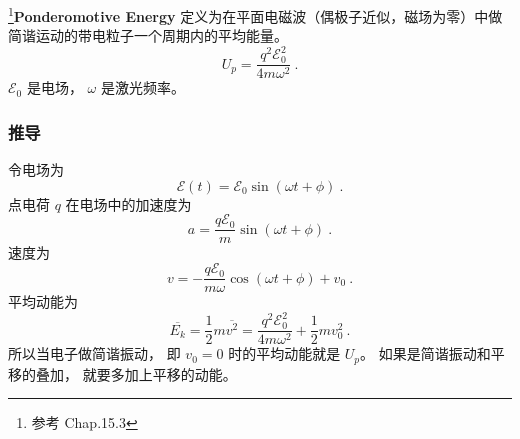 

\footnote{参考 \cite{Bransden} Chap.15.3}\textbf{Ponderomotive Energy} 定义为在平面电磁波（偶极子近似，磁场为零）中做简谐运动的带电粒子一个周期内的平均能量。
\begin{equation}\label{eq_Ponder_1}
U_p = \frac{q^2 \mathcal E_0^2}{4m\omega^2}~.
\end{equation}
$\mathcal E_0$ 是电场， $\omega$ 是激光频率。

\subsubsection{推导}
令电场为
\begin{equation}
\mathcal E(t) = \mathcal E_0 \sin(\omega t + \phi)~.
\end{equation}
点电荷 $q$ 在电场中的加速度为
\begin{equation}
a = \frac{q\mathcal E_0}{m} \sin(\omega t + \phi)~.
\end{equation}
速度为
\begin{equation}
v = -\frac{q\mathcal E_0}{m\omega} \cos(\omega t + \phi) + v_0~.
\end{equation}
平均动能为
\begin{equation}
\overline{E_k} = \frac{1}{2}m \overline{v^2} = \frac{q^2\mathcal E_0^2}{4m\omega^2} + \frac{1}{2}mv_0^2~.
\end{equation}
所以当电子做简谐振动， 即 $v_0 = 0$ 时的平均动能就是 $U_p$。 如果是简谐振动和平移的叠加， 就要多加上平移的动能。
